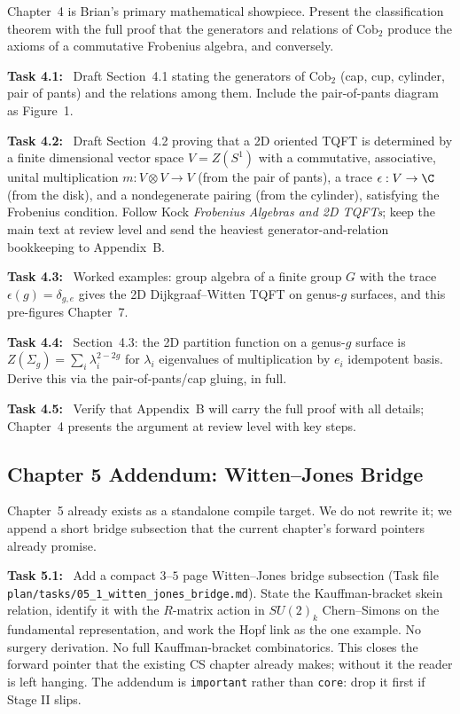 \documentclass[11pt]{article}
\newcommand{\task}[1]{\medskip\noindent\textbf{Task #1:}\ }
\begin{document}
\begin{insight}[Showpiece]
Chapter~4 is Brian's primary mathematical showpiece. Present the classification theorem
with the full proof that the generators and relations of $\mathrm{Cob}_2$ produce the
axioms of a commutative Frobenius algebra, and conversely.
\end{insight}

\task{4.1} Draft Section~4.1 stating the generators of $\mathrm{Cob}_2$ (cap, cup,
cylinder, pair of pants) and the relations among them. Include the pair-of-pants diagram
as Figure~1.

\task{4.2} Draft Section~4.2 proving that a 2D oriented TQFT is determined by a finite
dimensional vector space $V=Z(S^1)$ with a commutative, associative, unital
multiplication $m:V\otimes V\to V$ (from the pair of pants), a trace $\epsilon:V\to\C$
(from the disk), and a nondegenerate pairing (from the cylinder), satisfying the
Frobenius condition. Follow Kock \emph{Frobenius Algebras and 2D TQFTs}; keep the
main text at review level and send the heaviest generator-and-relation bookkeeping to
Appendix~B.

\task{4.3} Worked examples: group algebra of a finite group $G$ with the trace
$\epsilon(g)=\delta_{g,e}$ gives the 2D Dijkgraaf--Witten TQFT on genus-$g$
surfaces, and this pre-figures Chapter~7.

\task{4.4} Section~4.3: the 2D partition function on a genus-$g$ surface is
$Z(\Sigma_g) = \sum_i \lambda_i^{2-2g}$ for $\lambda_i$ eigenvalues of multiplication
by $e_i$ idempotent basis. Derive this via the pair-of-pants/cap gluing, in full.

\task{4.5} Verify that Appendix~B will carry the full proof with all details; Chapter~4
presents the argument at review level with key steps.

\subsection{Chapter 5 Addendum: Witten--Jones Bridge}

\begin{insight}
Chapter~5 already exists as a standalone compile target. We do not rewrite it; we append
a short bridge subsection that the current chapter's forward pointers already promise.
\end{insight}

\task{5.1} Add a compact $3$--$5$ page Witten--Jones bridge subsection (Task file
\texttt{plan/tasks/05\_1\_witten\_jones\_bridge.md}). State the Kauffman-bracket skein
relation, identify it with the $R$-matrix action in $SU(2)_k$ Chern--Simons on the
fundamental representation, and work the Hopf link as the one example. No surgery
derivation. No full Kauffman-bracket combinatorics. This closes the forward pointer that
the existing CS chapter already makes; without it the reader is left hanging. The
addendum is \texttt{important} rather than \texttt{core}: drop it first if Stage II slips.
\end{document}
